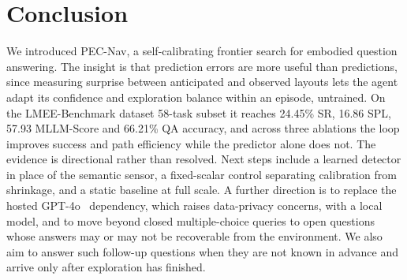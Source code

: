 \section{Conclusion}

We introduced PEC-Nav, a self-calibrating frontier search for embodied question answering. The insight is that prediction errors are more useful than predictions, since measuring surprise between anticipated and observed layouts lets the agent adapt its confidence and exploration balance within an episode, untrained. On the LMEE-Benchmark dataset 58-task subset it reaches 24.45\% SR, 16.86 SPL, 57.93 MLLM-Score and 66.21\% QA accuracy, and across three ablations the loop improves success and path efficiency while the predictor alone does not. The evidence is directional rather than resolved. Next steps include a learned detector in place of the semantic sensor, a fixed-scalar control separating calibration from shrinkage, and a static baseline at full scale. A further direction is to replace the hosted GPT-4o~\cite{openai2024gpt4o} dependency, which raises data-privacy concerns, with a local model, and to move beyond closed multiple-choice queries to open questions whose answers may or may not be recoverable from the environment. We also aim to answer such follow-up questions when they are not known in advance and arrive only after exploration has finished.
